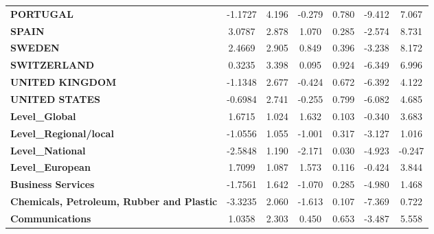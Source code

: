 \documentclass[ 11pt]{article}
\begin{document}
\begin{center}
\begin{longtable}{lcccccc}
\textbf{PORTUGAL}                                          &      -1.1727  &        4.196     &    -0.279  &         0.780        &       -9.412    &        7.067     \\
\textbf{SPAIN}                                             &       3.0787  &        2.878     &     1.070  &         0.285        &       -2.574    &        8.731     \\
\textbf{SWEDEN}                                            &       2.4669  &        2.905     &     0.849  &         0.396        &       -3.238    &        8.172     \\
\textbf{SWITZERLAND}                                       &       0.3235  &        3.398     &     0.095  &         0.924        &       -6.349    &        6.996     \\
\textbf{UNITED KINGDOM}                                    &      -1.1348  &        2.677     &    -0.424  &         0.672        &       -6.392    &        4.122     \\
\textbf{UNITED STATES}                                     &      -0.6984  &        2.741     &    -0.255  &         0.799        &       -6.082    &        4.685     \\
\textbf{Level\_Global}                                     &       1.6715  &        1.024     &     1.632  &         0.103        &       -0.340    &        3.683     \\
\textbf{Level\_Regional/local}                             &      -1.0556  &        1.055     &    -1.001  &         0.317        &       -3.127    &        1.016     \\
\textbf{Level\_National}                                   &      -2.5848  &        1.190     &    -2.171  &         0.030        &       -4.923    &       -0.247     \\
\textbf{Level\_European}                                   &       1.7099  &        1.087     &     1.573  &         0.116        &       -0.424    &        3.844     \\
\textbf{Business Services}                                 &      -1.7561  &        1.642     &    -1.070  &         0.285        &       -4.980    &        1.468     \\
\textbf{Chemicals, Petroleum, Rubber and Plastic}          &      -3.3235  &        2.060     &    -1.613  &         0.107        &       -7.369    &        0.722     \\
\textbf{Communications}                                    &       1.0358  &        2.303     &     0.450  &         0.653        &       -3.487    &        5.558     \\

\end{longtable}
\end{center}
\end{document}
